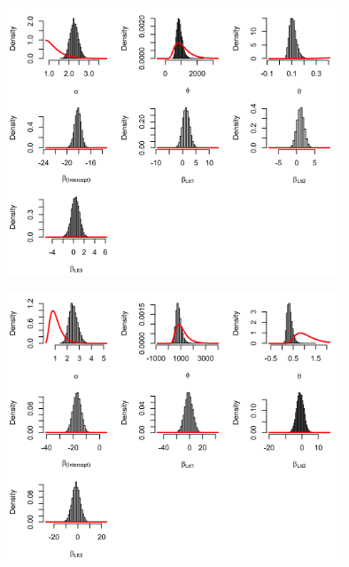     \begin{figure}[H]
        \begin{center}
            \includegraphics[width = \linewidth, height = 80mm]{Prior and posterior density plots - Major 0.png}
        \end{center}
    \end{figure}

    \begin{figure}[H]
        \begin{center}
            \includegraphics[width = \linewidth, height = 80mm]{Prior and posterior density plots - Major 2.png}
        \end{center}
    \end{figure}

